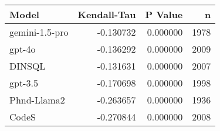 \begin{tabular}{lrrr}
\toprule
Model & Kendall-Tau & P Value & n \\
\midrule
gemini-1.5-pro & -0.130732 & 0.000000 & 1978 \\
gpt-4o & -0.136292 & 0.000000 & 2009 \\
DINSQL & -0.131631 & 0.000000 & 2007 \\
gpt-3.5 & -0.170698 & 0.000000 & 1998 \\
Phnd-Llama2 & -0.263657 & 0.000000 & 1936 \\
CodeS & -0.270844 & 0.000000 & 2008 \\
\bottomrule
\end{tabular}
